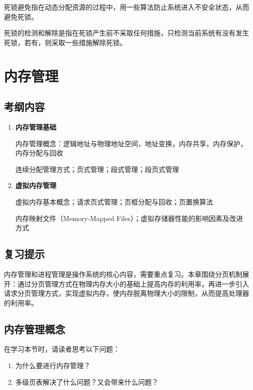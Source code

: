 \documentclass{ctexbook}
\begin{document}
		死锁避免指在动态分配资源的过程中，用一些算法防止系统进入不安全状态，从而避免死锁。
		
		死锁的检测和解除是指在死锁产生前不采取任何措施，只检测当前系统有没有发生死锁，若有，则采取一些措施解除死锁。
	
	\chapter{内存管理}
	
	\section*{考纲内容}
	
	\begin{enumerate}
		\item \textbf{内存管理基础}
		
		
	内存管理概念：逻辑地址与物理地址空间，地址变换，内存共享，内存保护，内存分配与回收
		
	连续分配管理方式；页式管理；段式管理；段页式管理
		
		\item \textbf{虚拟内存管理}
		
		
	虚拟内存基本概念；请求页式管理；页框分配与回收；页置换算法
		
	内存映射文件（Memory-Mapped Files）；虚拟存储器性能的影响因素及改进方式
		
	\end{enumerate}
	
	\section*{复习提示}
	
	内存管理和进程管理是操作系统的核心内容，需要重点复习。本章围绕分页机制展开：通过分页管理方式在物理内存大小的基础上提高内存的利用率，再进一步引入请求分页管理方式，实现虚拟内存，使内存脱离物理大小的限制，从而提高处理器的利用率。
	
	\section{内存管理概念}
	
	在学习本节时，请读者思考以下问题：
	\begin{enumerate}
		\item 为什么要进行内存管理？
		\item 多级页表解决了什么问题？又会带来什么问题？
	\end{enumerate}
	
\end{document}
